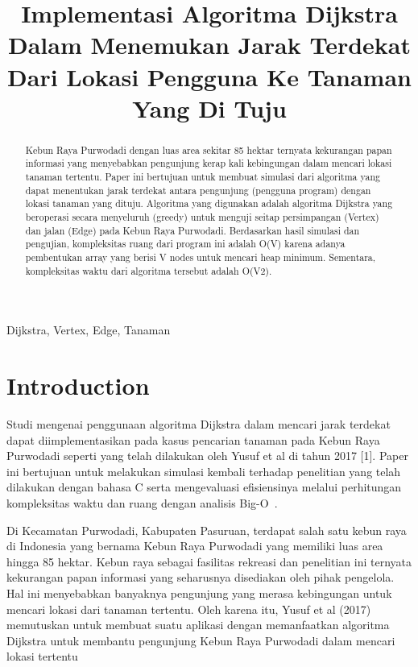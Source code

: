 \documentclass[conference]{IEEEtran}
\title{Implementasi Algoritma Dijkstra Dalam
Menemukan Jarak Terdekat Dari Lokasi Pengguna
Ke Tanaman Yang Di Tuju}
\author{\IEEEauthorblockN{Fariz Iftikhar Falakh}
\IEEEauthorblockA{\textit{School of Electrical Engineering and Informatics}\\
\textit{Institut Teknologi Bandung}\\
Bandung, Indonesia\\
Email: 13220029@std.stei.itb.ac.id}
}
\begin{document}
\maketitle

\begin{abstract}
    Kebun Raya Purwodadi dengan luas area sekitar 85 hektar ternyata kekurangan papan informasi yang menyebabkan pengunjung kerap kali kebingungan dalam mencari lokasi tanaman tertentu. Paper ini bertujuan untuk membuat simulasi dari algoritma yang dapat menentukan jarak terdekat antara pengunjung (pengguna program) dengan lokasi tanaman yang dituju. Algoritma yang digunakan adalah algoritma Dijkstra yang beroperasi secara menyeluruh (greedy) untuk menguji seitap persimpangan (Vertex) dan jalan (Edge) pada Kebun Raya Purwodadi. Berdasarkan hasil simulasi dan pengujian, kompleksitas ruang dari program ini adalah O(V) karena adanya pembentukan array yang berisi V nodes untuk mencari heap minimum. Sementara, kompleksitas waktu dari algoritma tersebut adalah O(V2).
\end{abstract}

\begin{IEEEkeywords}
Dijkstra, Vertex, Edge, Tanaman
\end{IEEEkeywords}

\section{Introduction}
Studi mengenai penggunaan algoritma Dijkstra dalam mencari jarak terdekat dapat diimplementasikan pada kasus pencarian tanaman pada Kebun Raya Purwodadi seperti yang telah dilakukan oleh Yusuf et al di tahun 2017 [1]. Paper ini bertujuan untuk melakukan simulasi kembali terhadap penelitian yang telah dilakukan dengan bahasa C serta mengevaluasi efisiensinya melalui perhitungan kompleksitas waktu dan ruang dengan analisis Big-O~\cite{yusuf2017implementasi}.

Di Kecamatan Purwodadi, Kabupaten Pasuruan, terdapat salah satu kebun raya di Indonesia yang bernama Kebun Raya Purwodadi yang memiliki luas area hingga 85 hektar. Kebun raya sebagai fasilitas rekreasi dan penelitian ini ternyata kekurangan papan informasi yang seharusnya disediakan oleh pihak pengelola. Hal ini menyebabkan banyaknya pengunjung yang merasa kebingungan untuk mencari lokasi dari tanaman tertentu. Oleh karena itu, Yusuf et al (2017) memutuskan untuk membuat suatu aplikasi dengan memanfaatkan algoritma Dijkstra untuk membantu pengunjung Kebun Raya Purwodadi dalam mencari lokasi tertentu
\end{document}
